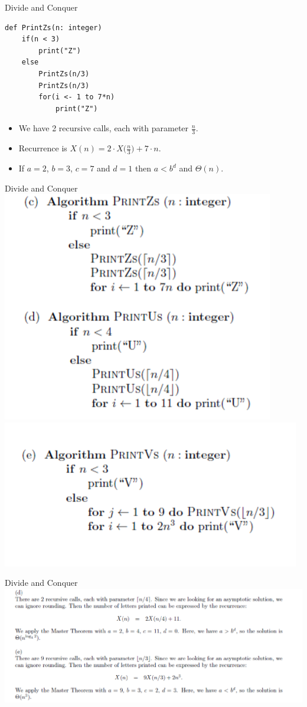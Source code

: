 \documentclass{beamer}
\begin{document}
\begin{frame}[fragile]{Divide and Conquer}
    \begin{center}
    \begin{minipage}{0.5\textwidth}
    \begin{verbatim}
def PrintZs(n: integer)
    if(n < 3)
        print("Z")
    else
        PrintZs(n/3)
        PrintZs(n/3)
        for(i <- 1 to 7*n)
            print("Z")
    \end{verbatim}
    \end{minipage}
    \end{center}
    \begin{itemize}
        \item We have 2 recursive calls, each with parameter $\frac{n}{3}$.
        \item Recurrence is $X(n) = 2 \cdot X \Big(\frac{n}{3}\Big) + 7 \cdot n$.
        \item If $a = 2$, $b = 3$, $c = 7$ and $d = 1$ then $a < b^d$ and $\Theta (n)$.
    \end{itemize}    
\end{frame}

\begin{frame}{Divide and Conquer}
    \centering
    \includegraphics[trim={0 0 0 2.5cm}, clip, width=.375\linewidth]{a1.PNG}
    \includegraphics[width=.375\linewidth]{a2.PNG}
\end{frame}

\begin{frame}{Divide and Conquer}
    \centering
    \includegraphics[width=.7\linewidth]{e.PNG}
\end{frame}
\end{document}
